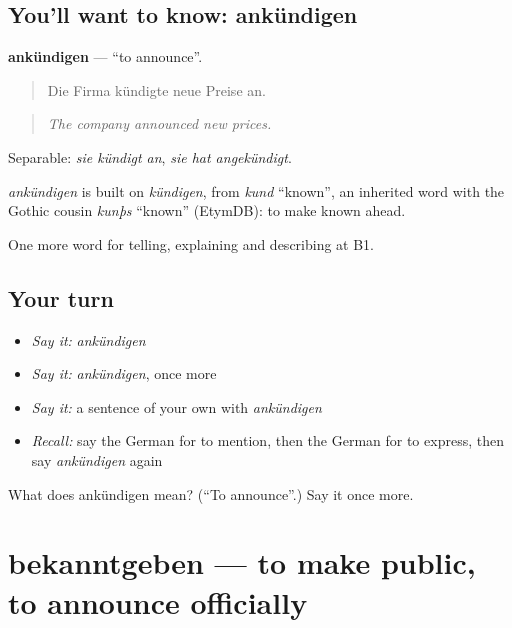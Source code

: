 \subsection*{You'll want to know: ankündigen}
\textbf{ankündigen} — \textquotedblleft{}to announce\textquotedblright{}.

\begin{quote}
Die Firma kündigte neue Preise an.
\end{quote}

\begin{quote}
\emph{The company announced new prices.}
\end{quote}

Separable: \emph{sie kündigt an}, \emph{sie hat angekündigt}.

\begin{cousinweb}
\emph{ankündigen} is built on \emph{kündigen}, from \emph{kund} \textquotedblleft{}known\textquotedblright{}, an inherited word with the Gothic cousin \emph{kunþs} \textquotedblleft{}known\textquotedblright{} (EtymDB): to make known ahead.
\end{cousinweb}

\begin{grammarlens}[title={What you've built}]
One more word for telling, explaining and describing at B1.
\end{grammarlens}

\subsection*{Your turn}
\begin{itemize}
\raggedright
  \item \emph{Say it:} \emph{ankündigen}
  \item \emph{Say it:} \emph{ankündigen}, once more
  \item \emph{Say it:} a sentence of your own with \emph{ankündigen}
  \item \emph{Recall:} say the German for to mention, then the German for to express, then say \emph{ankündigen} again
\end{itemize}

\begin{tcolorbox}[breakable,colback=teal!4,colframe=teal!35!black,title={Before you move on}]
What does ankündigen mean? (\textquotedblleft{}To announce\textquotedblright{}.) Say it once more.
\end{tcolorbox}
\section[bekanntgeben]{bekanntgeben — to make public, to announce officially}

